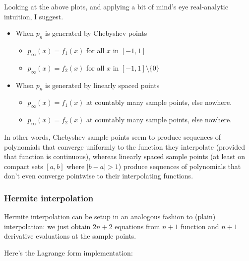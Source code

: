 \documentclass{article}
\providecommand{\tightlist}{%
      \setlength{\itemsep}{0pt}\setlength{\parskip}{0pt}}
\begin{document}
Looking at the above plots, and applying a bit of mind's eye
real-analytic intuition, I suggest.

\begin{itemize}
\item
  When \(p_n\) is generated by Chebyshev points

  \begin{itemize}
  \tightlist
  \item
    \(p_\infty(x) = f_1(x)\) for all \(x\) in \([-1,1]\)
  \item
    \(p_\infty(x) = f_2(x)\) for all \(x\) in \([-1,1]\setminus \{0\}\)
  \end{itemize}
\item
  When \(p_n\) is generated by linearly spaced points

  \begin{itemize}
  \tightlist
  \item
    \(p_\infty(x) = f_1(x)\) at countably many sample points, else
    nowhere.
  \item
    \(p_\infty(x) = f_2(x)\) at countably many sample points, else
    nowhere.
  \end{itemize}
\end{itemize}

In other words, Chebyshev sample points seem to produce sequences of
polynomials that converge uniformly to the function they interpolate
(provided that function is continuous), whereas linearly spaced sample
points (at least on compact sets \([a,b]\) where
\(\lvert b-a \rvert > 1\)) produce sequences of polynomials that don't
even converge pointwise to their interpolating functions.

\hypertarget{hermite-interpolation}{%
\subsubsection{Hermite interpolation}\label{hermite-interpolation}}

Hermite interpolation can be setup in an analogous fashion to (plain)
interpolation: we just obtain \(2n+2\) equations from \(n+1\) function
and \(n+1\) derivative evaluations at the sample points.

Here's the Lagrange form implementation:
\end{document}

